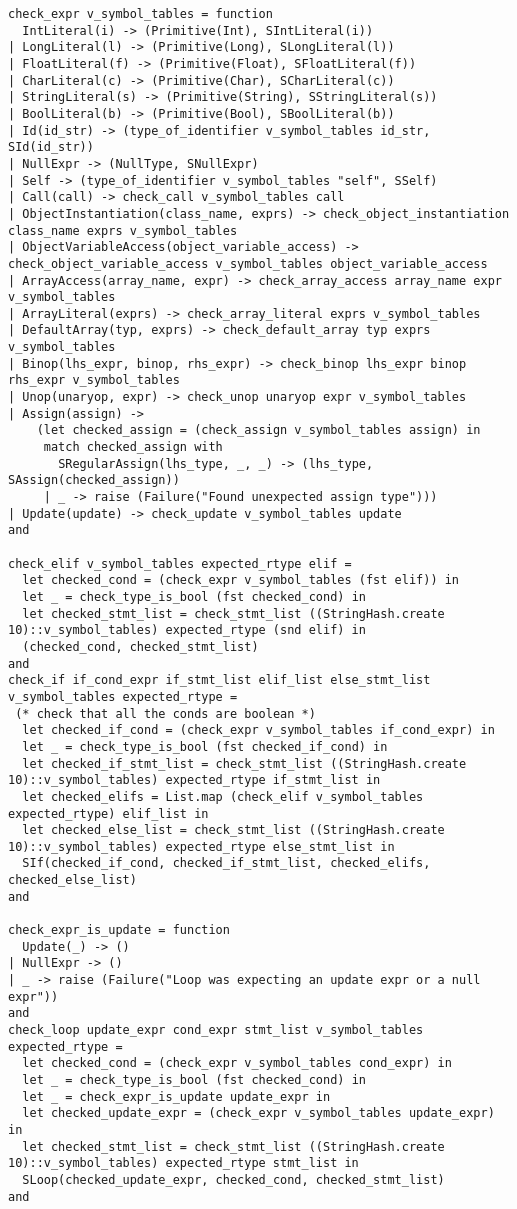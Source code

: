 \documentclass{article}
\begin{document}
\begin{verbatim}
check_expr v_symbol_tables = function
  IntLiteral(i) -> (Primitive(Int), SIntLiteral(i))
| LongLiteral(l) -> (Primitive(Long), SLongLiteral(l))
| FloatLiteral(f) -> (Primitive(Float), SFloatLiteral(f))
| CharLiteral(c) -> (Primitive(Char), SCharLiteral(c))
| StringLiteral(s) -> (Primitive(String), SStringLiteral(s))
| BoolLiteral(b) -> (Primitive(Bool), SBoolLiteral(b))
| Id(id_str) -> (type_of_identifier v_symbol_tables id_str, SId(id_str))
| NullExpr -> (NullType, SNullExpr)
| Self -> (type_of_identifier v_symbol_tables "self", SSelf)
| Call(call) -> check_call v_symbol_tables call
| ObjectInstantiation(class_name, exprs) -> check_object_instantiation class_name exprs v_symbol_tables
| ObjectVariableAccess(object_variable_access) -> check_object_variable_access v_symbol_tables object_variable_access
| ArrayAccess(array_name, expr) -> check_array_access array_name expr v_symbol_tables
| ArrayLiteral(exprs) -> check_array_literal exprs v_symbol_tables
| DefaultArray(typ, exprs) -> check_default_array typ exprs v_symbol_tables
| Binop(lhs_expr, binop, rhs_expr) -> check_binop lhs_expr binop rhs_expr v_symbol_tables
| Unop(unaryop, expr) -> check_unop unaryop expr v_symbol_tables
| Assign(assign) ->
    (let checked_assign = (check_assign v_symbol_tables assign) in
     match checked_assign with
       SRegularAssign(lhs_type, _, _) -> (lhs_type, SAssign(checked_assign))
     | _ -> raise (Failure("Found unexpected assign type")))
| Update(update) -> check_update v_symbol_tables update
and

check_elif v_symbol_tables expected_rtype elif =
  let checked_cond = (check_expr v_symbol_tables (fst elif)) in
  let _ = check_type_is_bool (fst checked_cond) in
  let checked_stmt_list = check_stmt_list ((StringHash.create 10)::v_symbol_tables) expected_rtype (snd elif) in
  (checked_cond, checked_stmt_list)
and
check_if if_cond_expr if_stmt_list elif_list else_stmt_list v_symbol_tables expected_rtype =
 (* check that all the conds are boolean *)
  let checked_if_cond = (check_expr v_symbol_tables if_cond_expr) in
  let _ = check_type_is_bool (fst checked_if_cond) in
  let checked_if_stmt_list = check_stmt_list ((StringHash.create 10)::v_symbol_tables) expected_rtype if_stmt_list in
  let checked_elifs = List.map (check_elif v_symbol_tables expected_rtype) elif_list in
  let checked_else_list = check_stmt_list ((StringHash.create 10)::v_symbol_tables) expected_rtype else_stmt_list in
  SIf(checked_if_cond, checked_if_stmt_list, checked_elifs, checked_else_list)
and

check_expr_is_update = function
  Update(_) -> ()
| NullExpr -> ()
| _ -> raise (Failure("Loop was expecting an update expr or a null expr"))
and
check_loop update_expr cond_expr stmt_list v_symbol_tables expected_rtype =
  let checked_cond = (check_expr v_symbol_tables cond_expr) in
  let _ = check_type_is_bool (fst checked_cond) in
  let _ = check_expr_is_update update_expr in
  let checked_update_expr = (check_expr v_symbol_tables update_expr) in
  let checked_stmt_list = check_stmt_list ((StringHash.create 10)::v_symbol_tables) expected_rtype stmt_list in
  SLoop(checked_update_expr, checked_cond, checked_stmt_list)
and


\end{verbatim}
\end{document}

